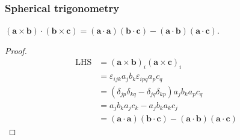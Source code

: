 \documentclass[a4paper]{article}
\begin{document}
\subsubsection*{Spherical trigonometry}
\begin{prop}
  $\mathbf{(a\times b)\cdot (b\times c) = (a\cdot a)(b\cdot c) - (a\cdot b)(a\cdot c)}$.
\end{prop}
\begin{proof}
  \begin{align*}
    \text{LHS} &= (\mathbf{a\times b})_i(\mathbf{a\times c})_i\\
    &= \varepsilon_{ijk}a_jb_k\varepsilon_{ipq} a_pc_q\\
    &= (\delta_{jp}\delta_{kq} - \delta_{jq}\delta_{kp})a_jb_ka_pc_q\\
    &= a_jb_k a_jc_k - a_j b_k a_k c_j\\
    &= \mathbf{(a\cdot a)(b\cdot c) - (a\cdot b)(a\cdot c)}
  \end{align*}
\end{proof}
\end{document}
